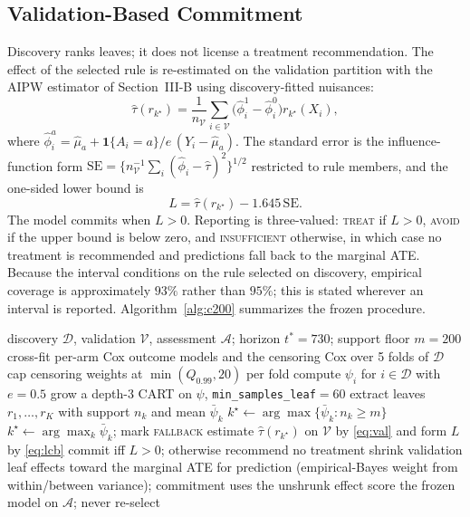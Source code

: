 \documentclass[conference]{IEEEtran}
\newcommand{\tstar}{t^{\ast}}
\begin{document}
\subsection{Validation-Based Commitment}

Discovery ranks leaves; it does not license a treatment recommendation. The
effect of the selected rule is re-estimated on the validation partition with
the AIPW estimator of Section~III-B using discovery-fitted nuisances:
\begin{equation}
\hat\tau(r_{k^{\star}})=\frac{1}{n_{\mathcal{V}}}\sum_{i\in\mathcal{V}}
\big(\hat\phi_{i}^{1}-\hat\phi_{i}^{0}\big) r_{k^{\star}}(X_{i}),
\label{eq:val}
\end{equation}
where $\hat\phi_{i}^{a}=\hat\mu_{a}+\mathbf{1}\{A_{i}=a\}/e\,(Y_{i}-\hat\mu_{a})$.
The standard error is the influence-function form
$\mathrm{SE}=\{n_{\mathcal{V}}^{-1}\sum_{i}(\hat\phi_{i}-\hat\tau)^{2}\}^{1/2}$
restricted to rule members, and the one-sided lower bound is
\begin{equation}
L=\hat\tau(r_{k^{\star}})-1.645\,\mathrm{SE}.
\label{eq:lcb}
\end{equation}
The model commits when $L>0$. Reporting is three-valued: \textsc{treat} if
$L>0$, \textsc{avoid} if the upper bound is below zero, and
\textsc{insufficient} otherwise, in which case no treatment is recommended and
predictions fall back to the marginal ATE. Because the interval conditions on
the rule selected on discovery, empirical coverage is approximately $93\%$
rather than $95\%$; this is stated wherever an interval is reported.
Algorithm~\ref{alg:c200} summarizes the frozen procedure.

\begin{algorithm}[t]
\caption{The frozen CISCaRL-C200 procedure}
\label{alg:c200}
\begin{algorithmic}[1]
\Require discovery $\mathcal{D}$, validation $\mathcal{V}$, assessment
$\mathcal{A}$; horizon $\tstar=730$; support floor $m=200$
\State cross-fit per-arm Cox outcome models and the censoring Cox over 5 folds
of $\mathcal{D}$
\State cap censoring weights at $\min(Q_{0.99},20)$ per fold
\State compute $\psi_{i}$ for $i\in\mathcal{D}$ with $e=0.5$
\State grow a depth-3 CART on $\psi$, \texttt{min\_samples\_leaf}${}=60$
\State extract leaves $r_{1},\dots,r_{K}$ with support $n_{k}$ and mean
$\bar\psi_{k}$
  \State $k^{\star}\gets\arg\max\{\bar\psi_{k}:n_{k}\ge m\}$
\Else
  \State $k^{\star}\gets\arg\max_{k}\bar\psi_{k}$; mark \textsc{fallback}
\EndIf
\State estimate $\hat\tau(r_{k^{\star}})$ on $\mathcal{V}$ by
\eqref{eq:val} and form $L$ by \eqref{eq:lcb}
\State commit iff $L>0$; otherwise recommend no treatment
\State shrink validation leaf effects toward the marginal ATE for prediction
(empirical-Bayes weight from within/between variance); commitment uses the
unshrunk effect
\State score the frozen model on $\mathcal{A}$; never re-select
\end{algorithmic}
\end{algorithm}
\end{document}
